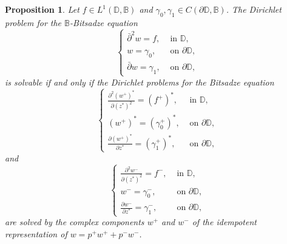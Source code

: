 \documentclass[12pt,reqno]{amsart}
\newtheorem{prop}[theorem]{Proposition}
\theoremstyle{definition}
\theoremstyle{remark}
\newcommand{\p}{\partial}
\newcommand{\dbar}{\bar\partial}
\newcommand{\bc}{\mathbb{B}}
\newcommand{\disk}{\mathbb{D}}
\begin{document}
            \begin{prop}\label{prop: bcdirichletiffcomplexdirichletfornequalstwo}
                Let $f \in L^1(\disk, \bc)$ and $\gamma_0, \gamma_1 \in C(\p\disk, \bc)$. The Dirichlet problem for the $\bc$-Bitsadze equation
                \[
                    \begin{cases}
                        \dbar^2 w = f, & \text{ in } \disk,\\
                        w = \gamma_0, & \text{ on } \p\disk,\\
                        \dbar w = \gamma_1, & \text{ on } \p\disk,
                    \end{cases}
                \]
              is solvable if and only if the Dirichlet problems for the Bitsadze equation
                \[
                    \begin{cases}
                        \frac{\p^2 (w^+)^*}{\p (z^*)^2} = (f^+)^*, & \text{ in } \disk,\\
                        (w^+)^* = (\gamma_0^+)^*, & \text{ on } \p\disk,\\
                        \frac{\p (w^+)^*}{\p z^*} = (\gamma_1^+)^*, & \text{ on } \p\disk,
                    \end{cases}
                \]
                and
                \[
                    \begin{cases}
                         \frac{\p^2 w^-}{\p (z^*)^2} = f^-, & \text{ in } \disk,\\
                        w^- = \gamma_0^-, & \text{ on } \p\disk,\\
                        \frac{\p w^-}{\p z^*} = \gamma_1^-, & \text{ on } \p\disk,
                    \end{cases}
                \]
                are solved by the complex components $w^+$ and $w^-$ of the idempotent representation of $w = p^+ w^+ + p^- w^-$. 
            \end{prop}
\end{document}
